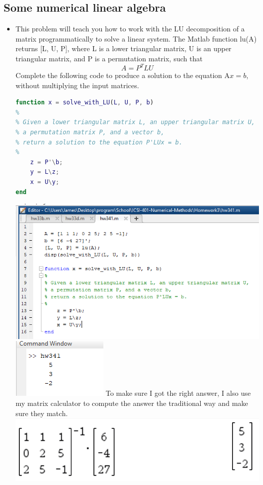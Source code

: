 \documentclass{article}
\begin{document}
\newpage
\subsection{Some numerical linear algebra}
\begin{itemize}
    \item This problem will teach you how to work with the LU decomposition of a matrix programmatically to solve a linear system. The Matlab function lu(A) returns [L, U, P], where L is a lower triangular matrix, U is an upper triangular matrix, and P is a permutation matrix, such that
    \[A = P^TLU\]
    Complete the following code to produce a solution to the equation A$x = b$, without multiplying the input matrices.
    \begin{lstlisting}[language=MATLAB]
function x = solve_with_LU(L, U, P, b)
%
% Given a lower triangular matrix L, an upper triangular matrix U,
% a permutation matrix P, and a vector b,
% return a solution to the equation P'LUx = b.
%
    z = P'\b;
    y = L\z;
    x = U\y;
end
    \end{lstlisting}
    \newline
    \includegraphics[scale=0.4]{Homework3/3.4.1.png}
    \newline
    \includegraphics[scale=0.4]{Homework3/res3.4.1.png}
    \newline
    To make sure I got the right answer, I also use my matrix calculator to compute the answer the traditional way and make sure they match. 
    \newline
    \includegraphics[scale=0.4]{Homework3/trad3.4.1.png}
    \newline
    

\end{itemize}
\end{document}

